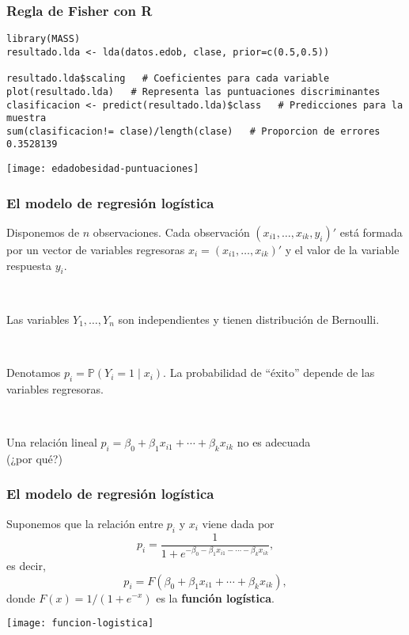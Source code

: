 \documentclass{beamer}
\begin{document}
\begin{frame}
\frametitle{Regla de Fisher con R}

{\scriptsize
\begin{verbatim}
library(MASS)
resultado.lda <- lda(datos.edob, clase, prior=c(0.5,0.5))

resultado.lda$scaling	# Coeficientes para cada variable
plot(resultado.lda)   # Representa las puntuaciones discriminantes
clasificacion <- predict(resultado.lda)$class   # Predicciones para la muestra
sum(clasificacion!= clase)/length(clase)   # Proporcion de errores
0.3528139
\end{verbatim}
}

\centerline{\texttt{[image: edadobesidad-puntuaciones]}}

\end{frame}
\begin{frame}[plain]
\frametitle{El modelo de regresión logística}


Disponemos de $n$ observaciones. Cada observación $(x_{i1},\ldots,x_{ik},y_i)'$ está formada por un vector de variables regresoras $x_i =(x_{i1},\ldots,x_{ik})'$ y el valor de la 
variable respuesta $y_i$.


\


Las variables $Y_1,\ldots,Y_n$ son independientes y tienen distribución de Bernoulli. 

\

Denotamos
$p_i=\mathbb{P}(Y_i=1 \mid x_i)$.
La probabilidad de ``éxito'' depende de las variables regresoras.



\

Una relación lineal $p_i=\beta_0+\beta_1x_{i1}+\cdots+\beta_kx_{ik}$ no es adecuada\\ (¿por qué?)


\end{frame}
\begin{frame}[plain]
\frametitle{El modelo de regresión logística}



Suponemos que la relación entre $p_i$ y $x_i$ viene dada por 
\[
p_i = \frac{1}{1+e^{-\beta_0-\beta_1x_{i1}-\cdots-\beta_kx_{ik}}},
\]
es decir,
\[
p_i = F(\beta_0+\beta_1x_{i1}+\cdots+\beta_kx_{ik}),
\]
donde $F(x)=1/(1+e^{-x})$ es la \textbf{función logística}.


\begin{center}
\texttt{[image: funcion-logistica]}
\end{center}


\end{frame}
\end{document}
